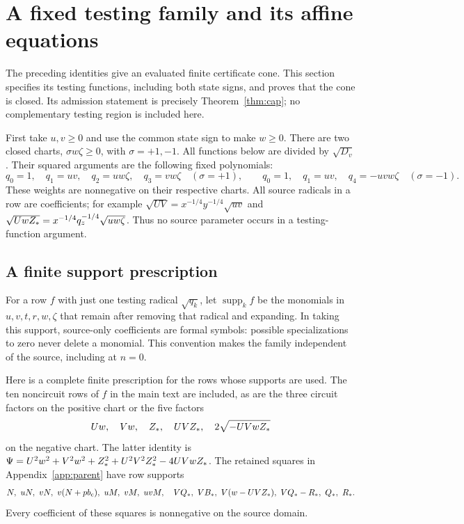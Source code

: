 \section{A fixed testing family and its affine equations}\label{app:functions}
The preceding identities give an evaluated finite certificate cone.
This section specifies its testing functions, including both state signs,
and proves that the cone is closed. Its admission statement is precisely
Theorem~\ref{thm:cap}; no complementary testing region is included here.

First take $u,v\geq0$ and use the common state sign to make $w\geq0$.
There are two closed charts, $\sigma w\zeta\geq0$, with $\sigma=+1,-1$.
All functions below are divided by $\sqrt{D_v}$. Their squared arguments
are the following fixed polynomials:
\[
 q_0=1,\quad q_1=uv,\quad q_2=uw\zeta,\quad q_3=vw\zeta
       \quad(\sigma=+1),\qquad
 q_0=1,\quad q_1=uv,\quad q_4=-uvw\zeta
       \quad(\sigma=-1).
\]
These weights are nonnegative on their respective charts. All source
radicals in a row are coefficients; for example
$\sqrt{UV}=x^{-1/4}y^{-1/4}\sqrt{uv}$ and
$\sqrt{UwZ_*}=x^{-1/4}q_z^{-1/4}\sqrt{uw\zeta}$.
Thus no source parameter occurs in a testing-function argument.

\subsection*{A finite support prescription}
For a row $f$ with just one testing radical $\sqrt{q_k}$, let
$\operatorname{supp}_k f$ be the monomials in $u,v,t,r,w,\zeta$ that
remain after removing that radical and expanding. In taking this
support, source-only coefficients are formal symbols: possible
specializations to zero never delete a monomial. This convention makes
the family independent of the source, including at $n=0$.

Here is a complete finite prescription for the rows whose supports
are used. The ten noncircuit rows of $f$ in the main text are included,
as are the three circuit factors on the positive chart or the five
factors
\[
 Uw,\quad Vw,\quad Z_*,\quad UVZ_*,\quad2\sqrt{-UVwZ_*}
\]
on the negative chart. The latter identity is
$\Psi=U^2w^2+V^2w^2+Z_*^2+U^2V^2Z_*^2-4UVwZ_*$.
The retained squares in Appendix~\ref{app:parent} have row supports
\begin{gather*}
 N,\ uN,\ vN,\ v(N+pb_{\mathrm c}),\ uM,\ vM,\ uvM,\quad
 VQ_*,\ VB_*,\ V(w-UVZ_*),\ VQ_*-R_*,\ Q_*,\ R_* .
\end{gather*}
Every coefficient of these squares is nonnegative on the source domain.

